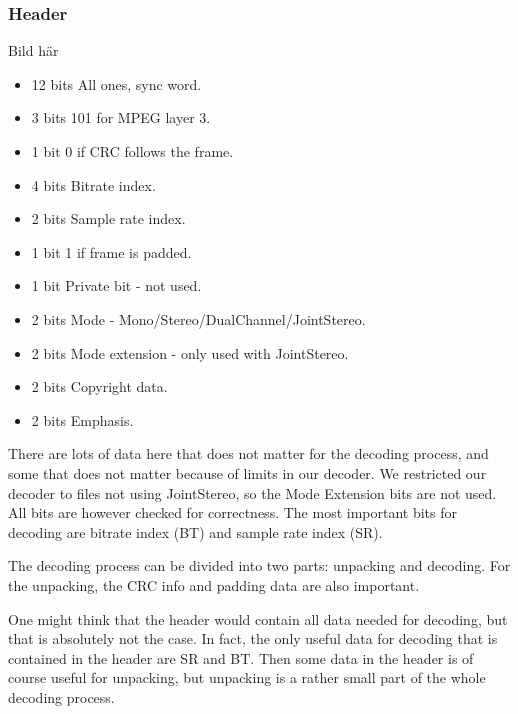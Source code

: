 \documentclass[a4paper,12pt]{article}
\begin{document}
       \subsubsection{Header}
       \label{sec:header}
            Bild här \\
            \begin{itemize}
                \item{12 bits} All ones, sync word.
                \item{3 bits} 101 for MPEG layer 3.
                \item{1 bit} 0 if CRC follows the frame.
                \item{4 bits} Bitrate index.
                \item{2 bits} Sample rate index.
                \item{1 bit} 1 if frame is padded.
                \item{1 bit} Private bit - not used.
                \item{2 bits} Mode - Mono/Stereo/DualChannel/JointStereo.
                \item{2 bits} Mode extension - only used with JointStereo.
                \item{2 bits} Copyright data.
                \item{2 bits} Emphasis.
            \end{itemize}
            
            There are lots of data here that does not matter for the decoding
            process, and some that does not matter because of limits in our
            decoder. We restricted our decoder to files not using JointStereo,
            so the Mode Extension bits are not used. All bits are however
            checked for correctness. The most important bits for decoding are
            bitrate index (BT) and sample rate index (SR).

            The decoding process can be divided into two parts: unpacking and
            decoding. For the unpacking, the CRC info and padding data are also
            important.

            One might think that the header would contain all data needed for
            decoding, but that is absolutely not the case. In fact, the only
            useful data for decoding that is contained in the header are SR and
            BT. Then some data in the header is of course useful for unpacking,
            but unpacking is a rather small part of the whole decoding process.
\end{document}
